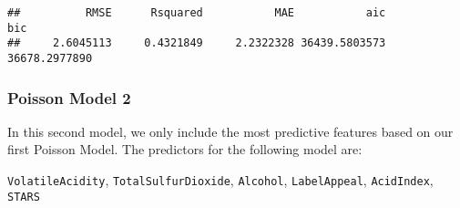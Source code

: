 \documentclass[
]{article}
\begin{document}
\begin{verbatim}
##          RMSE      Rsquared           MAE           aic           bic 
##     2.6045113     0.4321849     2.2322328 36439.5803573 36678.2977890
\end{verbatim}

\hypertarget{poisson-model-2}{%
\subsubsection{Poisson Model 2}\label{poisson-model-2}}

In this second model, we only include the most predictive features based
on our first Poisson Model. The predictors for the following model are:

\texttt{VolatileAcidity}, \texttt{TotalSulfurDioxide}, \texttt{Alcohol},
\texttt{LabelAppeal}, \texttt{AcidIndex}, \texttt{STARS}
\end{document}
